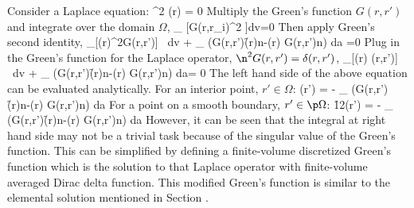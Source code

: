 Consider a Laplace equation:
\be
\n^2 \Phi(r) = 0
\ee
Multiply the Green's function $G(r, r')$ and integrate over the domain $\Omega$,
\be
\int_{\Omega} [G(r,r_i)\n^2 \Phi]dv=0
\ee
Then apply Green's second identity,
\be
\int_{\Omega}[\Phi(r)\n^2G(r,r')] \ dv + \int_{\p \Omega} (G(r,r')\f{\p\Phi(r)}{\p n}-\Phi(r)\f{ \p G(r,r')}{\p n}) da =0 \ee
Plug in the Green's function for the Laplace operator, $\n^2 G(r,r') = \delta(r,r')$,
\be
\int_{\Omega}[\Phi(r) \delta(r,r')] \ dv + \int_{\p \Omega} (G(r,r')\f{\p\Phi(r)}{\p n}-\Phi(r)\f{ \p G(r,r')}{\p n}) da= 0
\ee
The left hand side of the above equation can be evaluated analytically. For an interior point, $r' \in \Omega$:
\be
\Phi(r') = - \int_{\p \Omega} (G(r,r')\f{\p\Phi(r)}{\p n}-\Phi(r)\f{ \p G(r,r')}{\p n}) da
\ee
For a point on a smooth boundary, $r' \in \p \Omega$:
\be
\f{1}{2}\Phi(r') = - \int_{\p \Omega} (G(r,r')\f{\p\Phi(r)}{\p n}-\Phi(r)\f{ \p G(r,r')}{\p n}) da
\ee
However, it can be seen that the integral at right hand side may not be a trivial task because of the singular value of the Green's function. This can be simplified by defining a finite-volume discretized Green's function which is the solution to that Laplace operator with finite-volume averaged Dirac delta function.
This modified Green's function is similar to the elemental solution mentioned in Section \label{section-ESS}.








